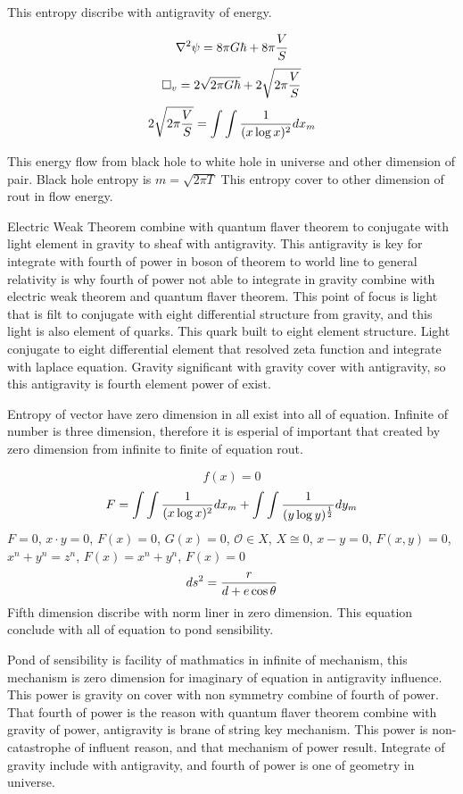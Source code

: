 \documentclass{jsarticle}
\begin{document}
This entropy discribe with antigravity of energy.

$$ \nabla^2 \psi = 8 \pi G \hbar + 8 \pi {V \over S} $$
$$ \square_v = 2 \sqrt{2 \pi G \hbar} + 2 \sqrt{2 \pi {V \over S}} $$
$$ 2 \sqrt{2 \pi {V \over S}} = \int \int {1 \over (x \log x)^2}dx_m $$

  This energy flow from black hole to white hole in universe and other dimension of pair.
  Black hole entropy is $ m = \sqrt{2 \pi T} $ This entropy cover to other dimension of rout in flow energy.

  Electric Weak Theorem combine with quantum flaver theorem to conjugate with light element in gravity to 
sheaf with antigravity. This antigravity is key for integrate with fourth of power in boson of theorem to
world line to general relativity is why fourth of power not able to integrate in gravity combine with electric weak
theorem and quantum flaver theorem. This point of focus is light that is filt to conjugate with eight differential
structure from gravity, and this light is also element of quarks. This quark built to eight element structure.
Light conjugate to eight differential element that resolved zeta function and integrate with laplace equation.
Gravity significant with gravity cover with antigravity, so this antigravity is fourth element power of exist.

  Entropy of vector have zero dimension in all exist into all of equation. Infinite of number is three dimension,
therefore it is esperial of important that created by zero dimension from infinite to finite of equation rout.

$$ f(x) = 0 $$ $$ F = \int \int {1 \over (x \log x)^2}dx_m + \int \int {1 \over (y \log y)^{1 \over 2}}dy_m $$
$ F = 0 $, $ x \cdot y = 0 $, $ F(x) = 0 $, $ G(x) = 0 $, $ \mathcal{O} \in X $, $ X \cong 0 $, $ x - y = 0 $,
$ F(x,y) = 0 $, $ x^n + y^n = z^n $, $ F(x) = x^n + y^n $, $ F(x) = 0 $
$$ ds^2 = {r \over {d + e\cos \theta}} $$
Fifth dimension discribe with norm liner in zero dimension. This equation conclude with all of equation to pond 
sensibility.


  Pond of sensibility is facility of mathmatics in infinite of mechanism, this mechanism is zero dimension 
for imaginary of equation in antigravity influence. This power is gravity on cover with non symmetry combine of fourth of power. 
That fourth of power is the reason with quantum flaver theorem combine with gravity of power, antigravity is brane of string key mechanism.
This power is non-catastrophe of influent reason, and that mechanism of power result.
Integrate of gravity include with antigravity, and fourth of power is one of geometry in universe.
\end{document}
